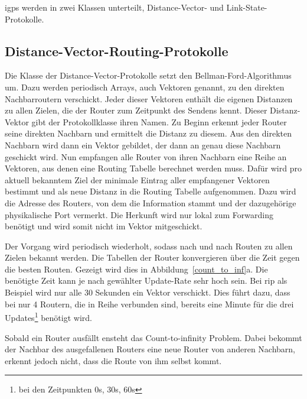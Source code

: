 \documentclass[11pt,a4paper,final]{article}
\begin{document}
\ac{igp}s werden in zwei Klassen unterteilt, Distance-Vector- und Link-State-Protokolle.
\subsection{Distance-Vector-Routing-Protokolle}
Die Klasse der Distance-Vector-Protokolle setzt den Bellman-Ford-Algorithmus um. Dazu werden periodisch Arrays, auch Vektoren genannt, zu den direkten Nachbarroutern verschickt. Jeder dieser Vektoren enthält die eigenen Distanzen zu allen Zielen, die der Router zum Zeitpunkt des Sendens kennt. Dieser Distanz-Vektor gibt der Protokollklasse ihren Namen.
\citep{weDVRP}
Zu Beginn erkennt jeder Router seine direkten Nachbarn und ermittelt die Distanz zu diesem. Aus den direkten Nachbarn wird dann ein Vektor gebildet, der dann an genau diese Nachbarn geschickt wird. Nun empfangen alle Router von ihren Nachbarn eine Reihe an Vektoren, aus denen eine Routing Tabelle berechnet werden muss. Dafür wird pro aktuell bekanntem Ziel der minimale Eintrag aller empfangener Vektoren bestimmt und als neue Distanz in die Routing Tabelle aufgenommen. Dazu wird die Adresse des Routers, von dem die Information stammt und der dazugehörige physikalische Port vermerkt. Die Herkunft wird nur lokal zum Forwarding benötigt und wird somit nicht im Vektor mitgeschickt.
\citep{rfc1058}

Der Vorgang wird periodisch wiederholt, sodass nach und nach Routen zu allen Zielen bekannt werden. Die Tabellen der Router konvergieren über die Zeit gegen die besten Routen. Gezeigt wird dies in Abbildung~\ref{count_to_inf}a. Die benötigte Zeit kann je nach gewählter Update-Rate sehr hoch sein. Bei \ac{rip} als Beispiel wird nur alle 30 Sekunden ein Vektor verschickt. Dies führt dazu, dass bei nur 4 Routern, die in Reihe verbunden sind, bereits eine Minute für  die drei Updates\footnote{bei den Zeitpunkten 0s, 30s, 60s} benötigt wird.
\citep{weRIP}

Sobald ein Router ausfällt ensteht das Count-to-infinity Problem.
Dabei bekommt der Nachbar des ausgefallenen Routers eine neue Router von anderen Nachbarn, erkennt jedoch nicht, dass die Route von ihm selbst kommt.
\end{document}
